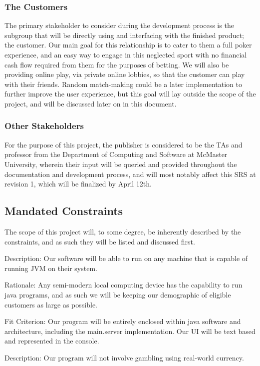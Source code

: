 \documentclass[12pt, titlepage]{article}
\begin{document}
\subsubsection{The Customers}
The primary stakeholder to consider during the development process is the subgroup that will be directly using and interfacing with the finished product; the customer. Our main goal for this relationship is to cater to them a full poker experience, and an easy way to engage in this neglected sport with no financial cash flow required from them for the purposes of betting. We will also be providing online play, via private online lobbies, so that the customer can play with their friends. Random match-making could be a later implementation to further improve the user experience, but this goal will lay outside the scope of the project, and will be discussed later on in this document.
\subsubsection{Other Stakeholders}
For the purpose of this project, the publisher is considered to be the TAs and professor from the Department of Computing and Software at McMaster University, wherein their input will be queried and provided throughout the documentation and development process, and will most notably affect this SRS at revision 1, which will be finalized by April 12th. 
\subsection{Mandated Constraints}
The scope of this project will, to some degree, be inherently described by the constraints, and as such they will be listed and discussed first. 

\bigskip

Description: Our software will be able to run on any machine that is capable of running JVM on their system.

Rationale: Any semi-modern local computing device has the capability to run java programs, and as such we will be keeping our demographic of eligible customers as large as possible.

Fit Criterion: Our program will be entirely enclosed within java software and architecture, including the main.server implementation. Our UI will be text based and represented in the console.

\bigskip

Description: Our program will not involve gambling using real-world currency.
\end{document}
